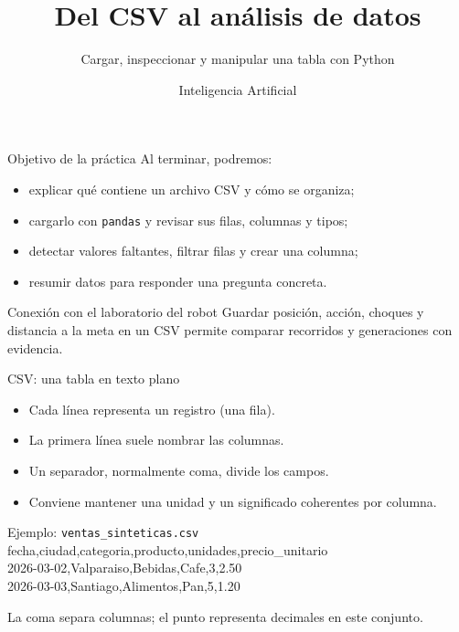 \documentclass[aspectratio=169,11pt]{beamer}
\title{Del CSV al análisis de datos}
\subtitle{Cargar, inspeccionar y manipular una tabla con Python}
\author{Inteligencia Artificial}
\date{}
\begin{document}
\begin{frame}
  \titlepage
\end{frame}

\begin{frame}{Objetivo de la práctica}
  Al terminar, podremos:
  \begin{itemize}
    \item explicar qué contiene un archivo CSV y cómo se organiza;
    \item cargarlo con \texttt{pandas} y revisar sus filas, columnas y tipos;
    \item detectar valores faltantes, filtrar filas y crear una columna;
    \item resumir datos para responder una pregunta concreta.
  \end{itemize}
  \begin{block}{Conexión con el laboratorio del robot}
    Guardar posición, acción, choques y distancia a la meta en un CSV permite comparar recorridos y generaciones con evidencia.
  \end{block}
\end{frame}

\begin{frame}{CSV: una tabla en texto plano}
  \begin{itemize}
    \item Cada línea representa un registro (una fila).
    \item La primera línea suele nombrar las columnas.
    \item Un separador, normalmente coma, divide los campos.
    \item Conviene mantener una unidad y un significado coherentes por columna.
  \end{itemize}
  \vspace{0.2cm}
  \begin{block}{Ejemplo: \texttt{ventas\_sinteticas.csv}}
    \ttfamily\scriptsize
    fecha,ciudad,categoria,producto,unidades,precio\_unitario\\
    2026-03-02,Valparaiso,Bebidas,Cafe,3,2.50\\
    2026-03-03,Santiago,Alimentos,Pan,5,1.20
  \end{block}
  \small La coma separa columnas; el punto representa decimales en este conjunto.
\end{frame}
\end{document}
